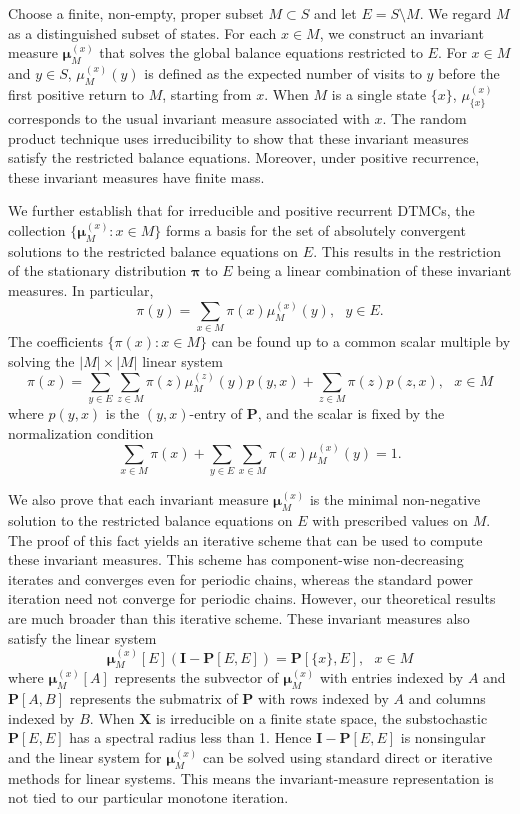 \documentclass[11pt]{article}
\newenvironment{changemargin}[2]{%
\begin{list}{}{%
\setlength{\topsep}{0pt}%
\setlength{\leftmargin}{#1}%
\setlength{\rightmargin}{#2}%
\setlength{\listparindent}{\parindent}%
\setlength{\itemindent}{\parindent}%
\setlength{\parsep}{\parskip}%
}%
\item[]}{\end{list}}
\begin{document}
\begin{changemargin}{-0.5cm}{-0.5cm}
Choose a finite, non-empty, proper subset $M \subset S$ and let $E = S\setminus M$. We regard $M$ as a distinguished subset of states. 
For each $x \in M$, we construct an invariant measure $\boldsymbol{\mu}_M^{(x)}$ that solves the global balance equations restricted to $E$. For $x \in M$ and $y \in S$, $\mu_{M}^{(x)}(y)$ is defined as the expected number of visits to $y$ before the first positive return to $M$, starting from $x$. When $M$ is a single state $\{x\}$, $\mu_{\{x\}}^{(x)}$ corresponds to the usual invariant measure associated with $x$. The random product technique \cite{FralixHasankhaniKhademi2024} uses irreducibility to show that these invariant measures satisfy the restricted balance equations. Moreover, under positive recurrence, these invariant measures have finite mass.

We further establish that for irreducible and positive recurrent DTMCs, the collection $\{\boldsymbol{\mu}_M^{(x)}:x \in M\}$ forms a basis for the set of absolutely convergent solutions to the restricted balance equations on $E$. This results in the restriction of the stationary distribution $\boldsymbol{\pi}$ to $E$ being a linear combination of these invariant measures. In particular,
$$\pi(y) = \sum_{x \in M} \pi(x) \mu_{M}^{(x)}(y), ~~~ y \in E.$$
The coefficients $\{\pi(x):x \in M\}$ can be found up to a common scalar multiple by solving the $|M| \times |M|$ linear system
$$\pi(x) = \sum_{y \in E} \sum_{z \in M} \pi(z) \mu_M^{(z)}(y) p(y,x) + \sum_{z \in M} \pi(z) p(z,x), ~~~x \in M$$
where $p(y,x)$ is the $(y,x)$-entry of $\mathbf{P}$, and the scalar is fixed by the normalization condition 
$$\sum _{x \in M} \pi(x) + \sum_{y \in E} \sum_{x \in M} \pi(x)\mu_M^{(x)}(y)=1.$$


We also prove that each invariant measure $\boldsymbol{\mu}_{M}^{(x)}$ is the minimal non-negative solution to the restricted balance equations on $E$ with prescribed values on $M$. The proof of this fact yields an iterative scheme that can be used to compute these invariant measures. This scheme has component-wise non-decreasing iterates and converges even for periodic chains, whereas the standard power iteration need not converge for periodic chains. However, our theoretical results are much broader than this iterative scheme. These invariant measures also satisfy the linear system
$$\boldsymbol{\mu}_M^{(x)}[E] (\mathbf{I} - \mathbf{P}[E,E]) = \mathbf{P}[\{x\},E], ~~~ x \in M$$
where $\boldsymbol{\mu}_M^{(x)}[A]$ represents the subvector of $\boldsymbol{\mu}_M^{(x)}$ with entries indexed by $A$ and $\mathbf{P}[A,B]$ represents the submatrix of $\mathbf{P}$ with rows indexed by $A$ and columns indexed by $B$.
When $\mathbf{X}$ is irreducible on a finite state space, the substochastic $\mathbf{P}[E,E]$ has a spectral radius less than 1. Hence $\mathbf{I} - \mathbf{P}[E,E]$ is nonsingular and the linear system for $\boldsymbol{\mu}_M^{(x)}$ can be solved using standard direct or iterative methods for linear systems. This means the invariant-measure representation is not tied to our particular monotone iteration.


\end{changemargin}
\end{document}

